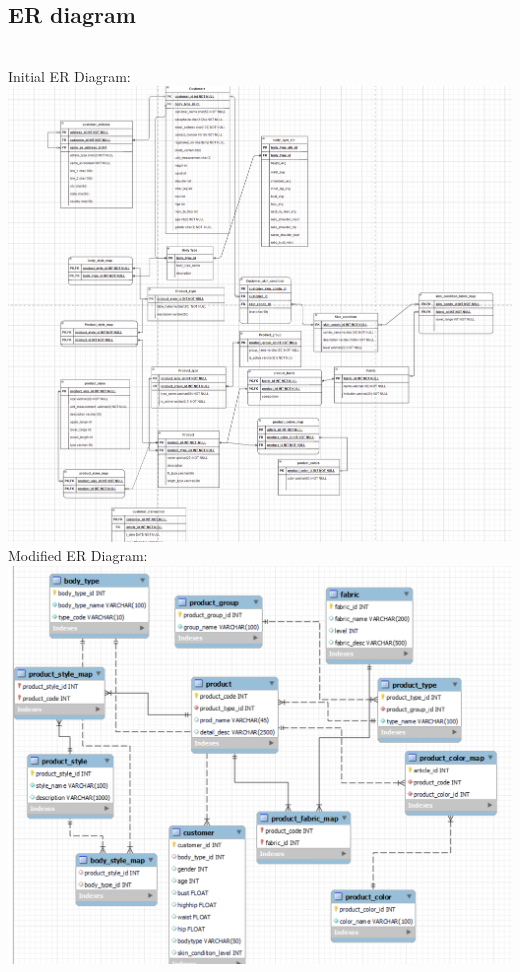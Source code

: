 \documentclass[11pt,journal,compsoc]{IEEEtran}
\begin{document}
\subsection{ER diagram} \\
Initial ER Diagram: \\
    \includegraphics[scale=0.375]{images/ERDiagram.png} \\
Modified ER Diagram: \\
    \includegraphics[scale=0.35]{images/ERdiagram_2.png} \\
\end{document}
